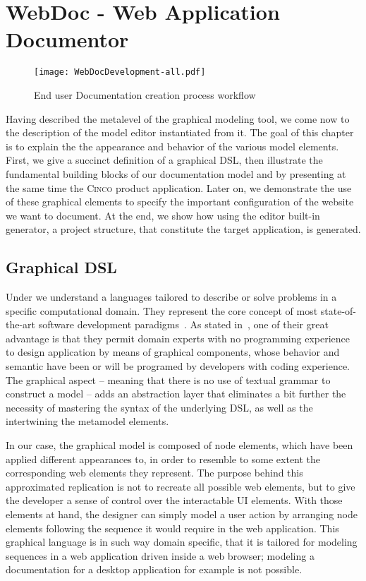 \chapter{WebDoc - Web Application Documentor}\label{ch:CP}

\begin{figure}[h]
    \centering
    \texttt{[image: WebDocDevelopment-all.pdf]}
    \caption{End user Documentation creation process workflow}
    \label{fig:procWorkflow}
\end{figure}

Having described the metalevel of the graphical modeling tool, we come now to the description of the model editor instantiated from it. The goal of this chapter is to explain the the appearance and behavior of the various model elements. First, we give a succinct definition of a graphical DSL, then illustrate the fundamental building blocks of our documentation model and by presenting at the same time the \textsc{Cinco} product application. Later on, we demonstrate the use of these graphical elements to specify the important configuration of the website we want to document. At the end, we show how using the editor built-in generator, a project structure, that constitute the target application, is generated.

\section{Graphical DSL}\label{sec:gDSL}

Under  we understand a languages tailored to describe or solve problems in a specific computational domain. They represent the core concept of most state-of-the-art software development paradigms~\cite{perez-et_al}. As stated in~\cite{Naujokat2018}, one of their great advantage is that they permit domain experts with no programming experience to design application by means of graphical components, whose behavior and semantic have been or will be programed by developers with coding experience. The graphical aspect -- meaning that there is no use of textual grammar to construct a model -- adds an abstraction layer that eliminates a bit further the necessity of mastering the syntax of the underlying DSL, as well as the  intertwining the metamodel elements.

In our case, the graphical model is composed of node elements, which have been applied different appearances to, in order to resemble to some extent the corresponding web elements they represent. The purpose behind this approximated replication is not to recreate all possible web elements, but to give the developer a sense of control over the interactable UI elements. With those elements at hand, the designer can simply model a user action by arranging node elements following the sequence it would require in the web application. This graphical language is in such way domain specific, that it is tailored for modeling sequences in a web application driven inside a web browser; modeling a documentation for a desktop application for example is not possible.

